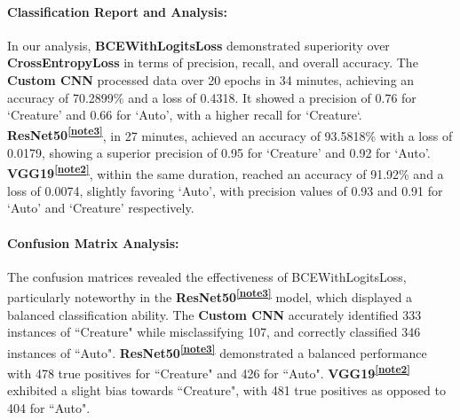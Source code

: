 \documentclass{article} %
\begin{document}
\paragraph{Classification Report and Analysis:}
In our analysis, \textbf{BCEWithLogitsLoss} demonstrated superiority over \textbf{CrossEntropyLoss} in terms of precision, recall, and overall accuracy. The \textbf{Custom CNN} processed data over 20 epochs in 34 minutes, achieving an accuracy of 70.2899\% and a loss of 0.4318. It showed a precision of 0.76 for `Creature' and 0.66 for `Auto', with a higher recall for `Creature`. \textbf{ResNet50\textsuperscript{\ref{note3}}}, in 27 minutes, achieved an accuracy of 93.5818\% with a loss of 0.0179, showing a superior precision of 0.95 for `Creature' and 0.92 for `Auto'. \textbf{VGG19\textsuperscript{\ref{note2}}}, within the same duration, reached an accuracy of 91.92\% and a loss of 0.0074, slightly favoring `Auto', with precision values of 0.93 and 0.91 for `Auto' and `Creature' respectively.

\paragraph{Confusion Matrix Analysis:}
The confusion matrices revealed the effectiveness of BCEWithLogitsLoss, particularly noteworthy in the \textbf{ResNet50\textsuperscript{\ref{note3}}} model, which displayed a balanced classification ability. The \textbf{Custom CNN} accurately identified 333 instances of ``Creature" while misclassifying 107, and correctly classified 346 instances of ``Auto". \textbf{ResNet50\textsuperscript{\ref{note3}}} demonstrated a balanced performance with 478 true positives for ``Creature" and 426 for ``Auto". \textbf{VGG19\textsuperscript{\ref{note2}}} exhibited a slight bias towards ``Creature", with 481 true positives as opposed to 404 for ``Auto".
\end{document}
